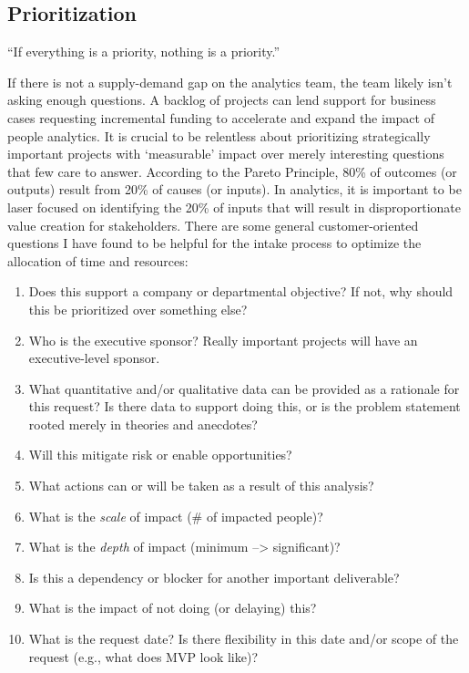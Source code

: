 \documentclass[
]{book}
\providecommand{\tightlist}{%
  \setlength{\itemsep}{0pt}\setlength{\parskip}{0pt}}
\begin{document}
\hypertarget{prioritization}{%
\subsection{Prioritization}\label{prioritization}}

``If everything is a priority, nothing is a priority.''

If there is not a supply-demand gap on the analytics team, the team likely isn't asking enough questions. A backlog of projects can lend support for business cases requesting incremental funding to accelerate and expand the impact of people analytics. It is crucial to be relentless about prioritizing strategically important projects with `measurable' impact over merely interesting questions that few care to answer. According to the Pareto Principle, 80\% of outcomes (or outputs) result from 20\% of causes (or inputs). In analytics, it is important to be laser focused on identifying the 20\% of inputs that will result in disproportionate value creation for stakeholders. There are some general customer-oriented questions I have found to be helpful for the intake process to optimize the allocation of time and resources:

\begin{enumerate}
\def\labelenumi{\arabic{enumi}.}
\tightlist
\item
  Does this support a company or departmental objective? If not, why should this be prioritized over something else?
\item
  Who is the executive sponsor? Really important projects will have an executive-level sponsor.
\item
  What quantitative and/or qualitative data can be provided as a rationale for this request? Is there data to support doing this, or is the problem statement rooted merely in theories and anecdotes?
\item
  Will this mitigate risk or enable opportunities?
\item
  What actions can or will be taken as a result of this analysis?
\item
  What is the \emph{scale} of impact (\# of impacted people)?
\item
  What is the \emph{depth} of impact (minimum --\textgreater{} significant)?
\item
  Is this a dependency or blocker for another important deliverable?
\item
  What is the impact of not doing (or delaying) this?
\item
  What is the request date? Is there flexibility in this date and/or scope of the request (e.g., what does MVP look like)?
\end{enumerate}
\end{document}
